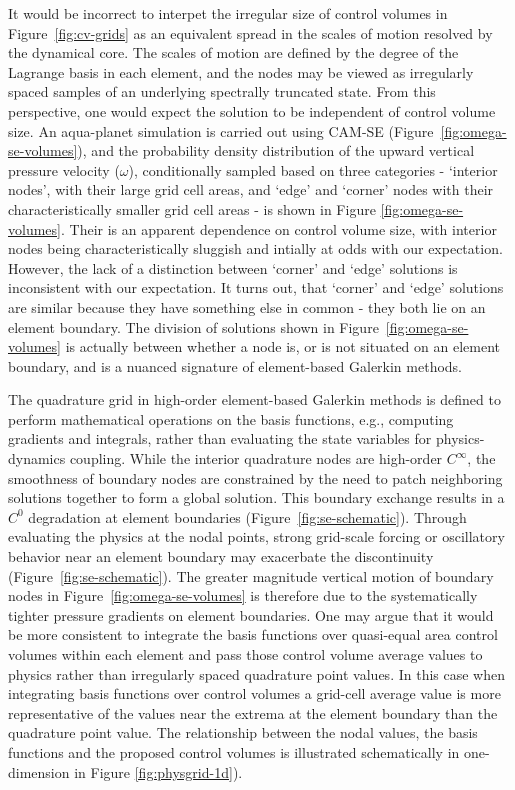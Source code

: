 \documentclass[twocol]{ametsoc}
\begin{document}
It would be incorrect to interpet the irregular size of control volumes in Figure~\ref{fig:cv-grids} as an equivalent spread in the scales of motion resolved by the dynamical core. The scales of motion are defined by the degree of the Lagrange basis in each element, and the nodes may be viewed as irregularly spaced samples of an underlying spectrally truncated state. From this perspective, one would expect the solution to be independent of control volume size. An aqua-planet simulation \citep{NH2000ASL,MWO2016JAMES} is carried out using CAM-SE (Figure~\ref{fig:omega-se-volumes}), and the probability density distribution of the upward vertical pressure velocity ($\omega$), conditionally sampled based on three categories - `interior nodes', with their large grid cell areas, and `edge' and `corner' nodes with their characteristically smaller grid cell areas - is shown in Figure \ref{fig:omega-se-volumes}. Their is an apparent dependence on control volume size, with interior nodes being characteristically sluggish and intially at odds with our expectation. However, the lack of a distinction between `corner' and `edge' solutions is inconsistent with our expectation. It turns out, that `corner' and `edge' solutions are similar because they have something else in common - they both lie on an element boundary. The division of solutions shown in Figure~\ref{fig:omega-se-volumes} is actually between whether a node is, or is not situated on an element boundary, and is a nuanced signature of element-based Galerkin methods.

The quadrature grid in high-order element-based Galerkin methods is defined to perform mathematical operations on the basis functions, e.g., computing gradients and integrals, rather than evaluating the state variables for physics-dynamics coupling. While the interior quadrature nodes are high-order $C^{\infty}$, the smoothness of boundary nodes are constrained by the need to patch neighboring solutions together to form a global solution. This boundary exchange results in a $C^0$ degradation at element boundaries (Figure~\ref{fig:se-schematic}). Through evaluating the physics at the nodal points, strong grid-scale forcing or oscillatory behavior near an element boundary may exacerbate the discontinuity (Figure~\ref{fig:se-schematic}). The greater magnitude vertical motion of boundary nodes in Figure~\ref{fig:omega-se-volumes} is therefore due to the systematically tighter pressure gradients on element boundaries. One may argue that it would be more consistent to integrate the basis functions over quasi-equal area control volumes within each element and pass those control volume average values to physics rather than irregularly spaced quadrature point values. In this case when integrating basis functions over control volumes a grid-cell average value is more representative of the values near the extrema at the element boundary than the quadrature point value. The relationship between the nodal values, the basis functions and the proposed control volumes is illustrated schematically in one-dimension in Figure \ref{fig:physgrid-1d}). 
\end{document}

